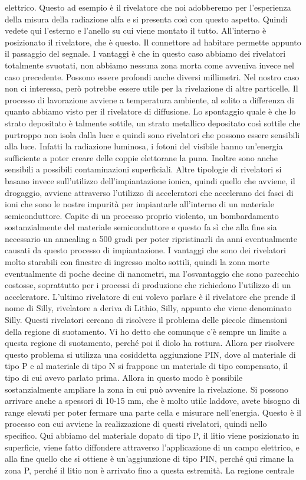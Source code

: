 elettrico. Questo ad esempio è il rivelatore che noi adobberemo per l'esperienza della misura della radiazione alfa e si presenta così con questo aspetto. Quindi vedete qui l'esterno e l'anello su cui viene montato il tutto. All'interno è posizionato il rivelatore, che è questo. Il connettore ad habitare permette appunto il passaggio del segnale. I vantaggi è che in questo caso abbiamo dei rivelatori totalmente svuotati, non abbiamo nessuna zona morta come avveniva invece nel caso precedente. Possono essere profondi anche diversi millimetri. Nel nostro caso non ci interessa, però potrebbe essere utile per la rivelazione di altre particelle. Il processo di lavorazione avviene a temperatura ambiente, al solito a differenza di quanto abbiamo visto per il rivelatore di diffusione. Lo spontaggio quale è che lo strato depositato è talmente sottile, un strato metallico depositato così sottile che purtroppo non isola dalla luce e quindi sono rivelatori che possono essere sensibili alla luce. Infatti la radiazione luminosa, i fotoni del visibile hanno un'energia sufficiente a poter creare delle coppie elettorane la puna. Inoltre sono anche sensibili a possibili contaminazioni superficiali. Altre tipologie di rivelatori si basano invece sull'utilizzo dell'impiantazione ionica, quindi quello che avviene, il drogaggio, avviene attraverso l'utilizzo di acceleratori che accelerano dei fasci di ioni che sono le nostre impurità per impiantarle all'interno di un materiale semiconduttore. Capite di un processo proprio violento, un bombardamento sostanzialmente del materiale semiconduttore e questo fa sì che alla fine sia necessario un annealing a 500 gradi per poter ripristinarli da anni eventualmente causati da questo processo di impiantazione. I vantaggi che sono dei rivelatori molto starabili con finestre di ingresso molto sottili, quindi la zona morte eventualmente di poche decine di nanometri, ma l'osvantaggio che sono parecchio costosse, soprattutto per i processi di produzione che richiedono l'utilizzo di un acceleratore. L'ultimo rivelatore di cui volevo parlare è il rivelatore che prende il nome di Silly, rivelatore a deriva di Lithio, Silly, appunto che viene denominato Silly. Questi rivelatori cercano di risolvere il problema delle piccole dimensioni della regione di suotamento. Vi ho detto che comunque c'è sempre un limite a questa regione di suotamento, perché poi il diolo ha rottura. Allora per risolvere questo problema si utilizza una cosiddetta aggiunzione PIN, dove al materiale di tipo P e al materiale di tipo N si frappone un materiale di tipo compensato, il tipo di cui avevo parlato prima. Allora in questo modo è possibile sostanzialmente ampliare la zona in cui può avvenire la rivelazione. Si possono arrivare anche a spessori di 10-15 mm, che è molto utile laddove, avete bisogno di range elevati per poter fermare una parte cella e misurare nell'energia. Questo è il processo con cui avviene la realizzazione di questi rivelatori, quindi nello specifico. Qui abbiamo del materiale dopato di tipo P, il litio viene posizionato in superficie, viene fatto diffondere attraverso l'applicazione di un campo elettrico, e alla fine quello che si ottiene è un'aggiunzione di tipo PIN, perché qui rimane la zona P, perché il litio non è arrivato fino a questa estremità. La regione centrale 